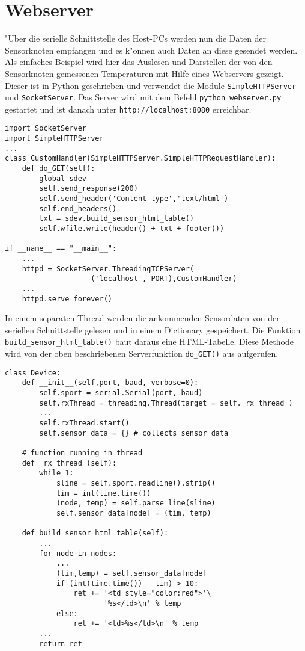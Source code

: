 \section{Webserver}
%
%
"Uber die serielle Schnittstelle des Host-PCs werden nun die Daten der Sensorknoten empfangen
und es k"onnen auch Daten an diese gesendet werden. 
Als einfaches Beispiel wird hier das Auslesen und
Darstellen der von den Sensorknoten gemessenen Temperaturen mit Hilfe 
eines Webservers gezeigt. Dieser ist in Python geschrieben und verwendet
die Module \texttt{Simple\-HTTP\-Server} und \texttt{SocketServer}.
Das Server wird mit dem Befehl \texttt{python webserver.py} gestartet und 
ist danach unter \texttt{http://localhost:8080} erreichbar.

\begin{lstlisting}[tabsize=4]
import SocketServer
import SimpleHTTPServer
...
class CustomHandler(SimpleHTTPServer.SimpleHTTPRequestHandler):
    def do_GET(self):
        global sdev
        self.send_response(200)
        self.send_header('Content-type','text/html')
        self.end_headers()
        txt = sdev.build_sensor_html_table()
        self.wfile.write(header() + txt + footer())

if __name__ == "__main__":
	...
    httpd = SocketServer.ThreadingTCPServer(
                    ('localhost', PORT),CustomHandler)
	...
	httpd.serve_forever()
\end{lstlisting}

In einem separaten Thread werden die ankommenden Sensordaten von der
seriellen Schnittstelle gelesen und in einem Dictionary gespeichert.
Die Funktion {\tt build\_sensor\_html\_table()} baut daraus eine HTML-Tabelle. 
Diese Methode wird von der oben beschriebenen Serverfunktion 
{\tt do\_GET()} aus aufgerufen.
\begin{lstlisting}[tabsize=4]
class Device:
    def __init__(self,port, baud, verbose=0):
        self.sport = serial.Serial(port, baud)
        self.rxThread = threading.Thread(target = self._rx_thread_)
        ...
        self.rxThread.start()
        self.sensor_data = {} # collects sensor data

    # function running in thread
    def _rx_thread_(self):
        while 1:
            sline = self.sport.readline().strip()
            tim = int(time.time())
            (node, temp) = self.parse_line(sline)
            self.sensor_data[node] = (tim, temp)

    def build_sensor_html_table(self):
        ...
        for node in nodes:
            ...
            (tim,temp) = self.sensor_data[node]
            if (int(time.time()) - tim) > 10:
                ret += '<td style="color:red">'\
                       '%s</td>\n' % temp
            else:  
                ret += '<td>%s</td>\n' % temp
        ...
        return ret
\end{lstlisting}

